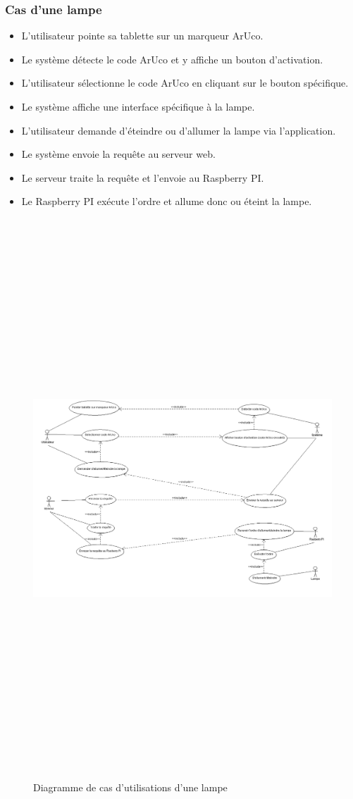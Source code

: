 \documentclass[12pt,a4paper]{article}
\begin{document}
\subsubsection{Cas d'une lampe}
\begin{itemize}
  \item L'utilisateur pointe sa tablette sur un marqueur ArUco.
  \item Le système détecte le code ArUco et y affiche un bouton d'activation. 
  \item L'utilisateur sélectionne le code ArUco en cliquant sur le bouton spécifique.
  \item Le système affiche une interface spécifique à la lampe.
  \item L'utilisateur demande d'éteindre ou d'allumer la lampe via l'application.
  \item Le système envoie la requête au serveur web.
  \item Le serveur traite la requête et l'envoie au Raspberry PI.
  \item Le Raspberry PI exécute l'ordre et allume donc ou éteint la lampe.
\end{itemize}
  \newpage
\begin{figure}[!ht]
  \centering
  \includegraphics[width = 15cm,height=21cm]{DCU_Lampe.png}
  \caption{Diagramme de cas d'utilisations d'une lampe}
\end{figure}
\end{document}
